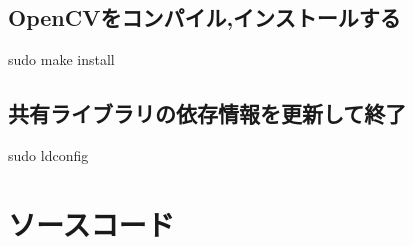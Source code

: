 \documentclass[12pt,oneside]{sotsuken_paper}
\begin{document}
\subsection{OpenCVをコンパイル,インストールする}

sudo make install

\subsection{共有ライブラリの依存情報を更新して終了}

sudo ldconfig

\newpage


\newpage
\section{ソースコード}



















\end{document}
